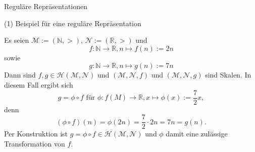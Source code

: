 \documentclass[
  8pt,
  ignorenonframetext,
]{beamer}
\begin{document}
\begin{frame}{Reguläre Repräsentationen}
\protect\hypertarget{reguluxe4re-repruxe4sentationen-3}{}
\small

\noindent (1) Beispiel für eine reguläre Repräsentation \footnotesize

\footnotesize

Es seien \(\mathcal{M} := (\mathbb{N},>)\),
\(\mathcal{N} := (\mathbb{R},>)\) und \begin{equation}
f : \mathbb{N} \to \mathbb{R}, n \mapsto f(n) := 2n
\end{equation} sowie \begin{equation}
g : \mathbb{N} \to \mathbb{R}, n \mapsto g(n) := 7n
\end{equation} Dann sind
\(f,g\in \mathcal{H}(\mathcal{M}, \mathcal{N})\) und
\((\mathcal{M},\mathcal{N},f)\) und \((\mathcal{M},\mathcal{N},g)\) sind
Skalen. In diesem Fall ergibt sich \begin{equation}
g = \phi \circ f \mbox{ für }\phi : f(M) \to \mathbb{R}, x \mapsto \phi(x) := \frac{7}{2}x,
\end{equation} denn \begin{equation}
(\phi \circ f)(n) = \phi(2n) = \frac{7}{2}\cdot 2n = 7n = g(n).
\end{equation} Per Konstruktion ist
\(g = \phi\circ f\in \mathcal{H}(\mathcal{M}, \mathcal{N})\) und
\(\phi\) damit eine zulässige Transformation von \(f\).
\end{frame}
\end{document}
